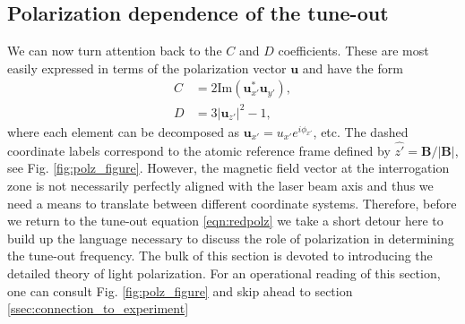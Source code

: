 





\subsection{Polarization dependence of the tune-out}
	\label{sec:polz_dep}
	We can now turn attention back to the $C$ and $D$ coefficients. These are most easily expressed in terms of the polarization vector $\mathbf{u}$ and have the form
	\begin{align}
		C &= 2\mathrm{Im}(\mathbf{u}_{x'}^*\mathbf{u}_{y'}),\\
		D &= 3|\mathbf{u}_{z'}|^2-1,
	\end{align}
	where each element can be decomposed as $\mathbf{u}_{x'} = u_{x'} e^{i\phi_{x'}}$, etc.
	The dashed coordinate labels correspond to the atomic reference frame defined by $\hat{z'} = \mathbf{B}/|\mathbf{B}|$, see Fig. \ref{fig:polz_figure}.
	However, the magnetic field vector at the interrogation zone is not necessarily perfectly aligned with the laser beam axis and thus we need a means to translate between different coordinate systems.
	Therefore, before we return to the tune-out equation \ref{eqn:redpolz} we take a short detour here to build up the language necessary to discuss the role of polarization in determining the tune-out frequency.
	The bulk of this section is devoted to introducing the detailed theory of light polarization. For an operational reading of this section, one can consult Fig. \ref{fig:polz_figure} and skip ahead to section \ref{ssec:connection_to_experiment}

	

